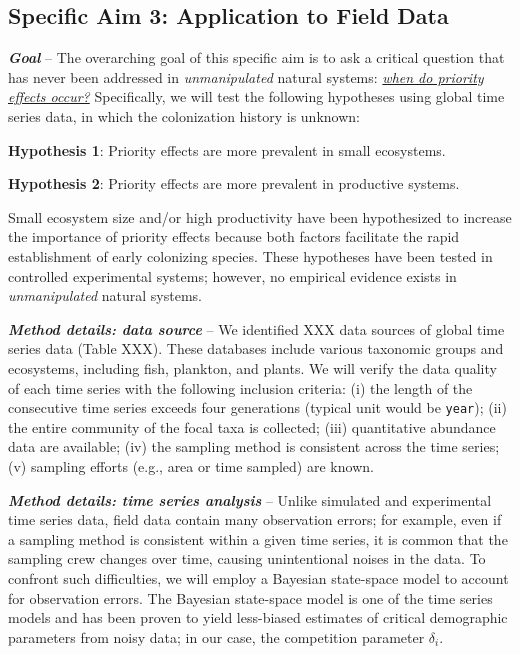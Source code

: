 \documentclass[12pt, class=article, crop=false]{standalone}
\begin{document}
\subsection*{Specific Aim 3: Application to Field Data}

\textbf{\textit{Goal}} -- 
The overarching goal of this specific aim is to ask a critical question that has never been addressed in \textit{unmanipulated} natural systems: \ul{\textit{when do priority effects occur?}} Specifically, we will test the following hypotheses using global time series data, in which the colonization history is unknown:

\textbf{Hypothesis 1}: Priority effects are more prevalent in small ecosystems.

\textbf{Hypothesis 2}: Priority effects are more prevalent in productive systems.

Small ecosystem size and/or high productivity have been hypothesized to increase the importance of priority effects because both factors facilitate the rapid establishment of early colonizing species.
These hypotheses have been tested in controlled experimental systems; however, no empirical evidence exists in \textit{unmanipulated} natural systems.

\textit{\textbf{Method details: data source}} --
We identified XXX data sources of global time series data (Table XXX).
These databases include various taxonomic groups and ecosystems, including fish, plankton, and plants.
We will verify the data quality of each time series with the following inclusion criteria: (i) the length of the consecutive time series exceeds four generations (typical unit would be \texttt{year}); (ii) the entire community of the focal taxa is collected; (iii) quantitative abundance data are available; (iv) the sampling method is consistent across the time series; (v) sampling efforts (e.g., area or time sampled) are known.

\textit{\textbf{Method details: time series analysis}} --
Unlike simulated and experimental time series data, field data contain many observation errors; for example, even if a sampling method is consistent within a given time series, it is common that the sampling crew changes over time, causing unintentional noises in the data.
To confront such difficulties, we will employ a Bayesian state-space model to account for observation errors.
The Bayesian state-space model is one of the time series models and has been proven to yield less-biased estimates of critical demographic parameters from noisy data; in our case, the competition parameter $\delta_i$.
\end{document}
